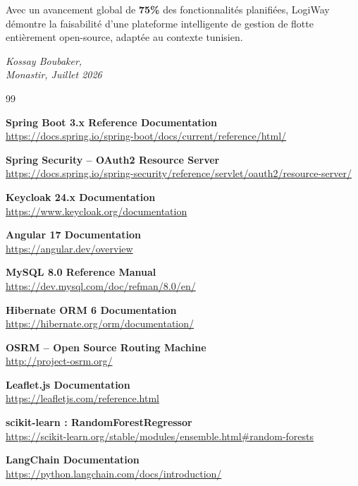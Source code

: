 \documentclass[12pt,a4paper]{report}
\begin{document}
Avec un avancement global de \textbf{75\%} des fonctionnalités planifiées,
LogiWay démontre la faisabilité d'une plateforme intelligente de gestion
de flotte entièrement open-source, adaptée au contexte tunisien.

\medskip
\begin{flushright}
  \textit{Kossay Boubaker,}\\
  \textit{Monastir, Juillet 2026}
\end{flushright}

\newpage

\begin{thebibliography}{99}

\textbf{Spring Boot 3.x Reference Documentation}\\
\url{https://docs.spring.io/spring-boot/docs/current/reference/html/}

\textbf{Spring Security -- OAuth2 Resource Server}\\
\url{https://docs.spring.io/spring-security/reference/servlet/oauth2/resource-server/}

\textbf{Keycloak 24.x Documentation}\\
\url{https://www.keycloak.org/documentation}

\textbf{Angular 17 Documentation}\\
\url{https://angular.dev/overview}

\textbf{MySQL 8.0 Reference Manual}\\
\url{https://dev.mysql.com/doc/refman/8.0/en/}

\textbf{Hibernate ORM 6 Documentation}\\
\url{https://hibernate.org/orm/documentation/}

\textbf{OSRM -- Open Source Routing Machine}\\
\url{http://project-osrm.org/}

\textbf{Leaflet.js Documentation}\\
\url{https://leafletjs.com/reference.html}

\textbf{scikit-learn : RandomForestRegressor}\\
\url{https://scikit-learn.org/stable/modules/ensemble.html\#random-forests}

\textbf{LangChain Documentation}\\
\url{https://python.langchain.com/docs/introduction/}


\end{thebibliography}
\end{document}
